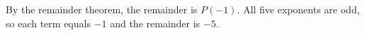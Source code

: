 By the remainder theorem, the remainder is $P(-1)$. All five exponents are odd, so each term equals $-1$ and the remainder is $\boxed{-5}$.
